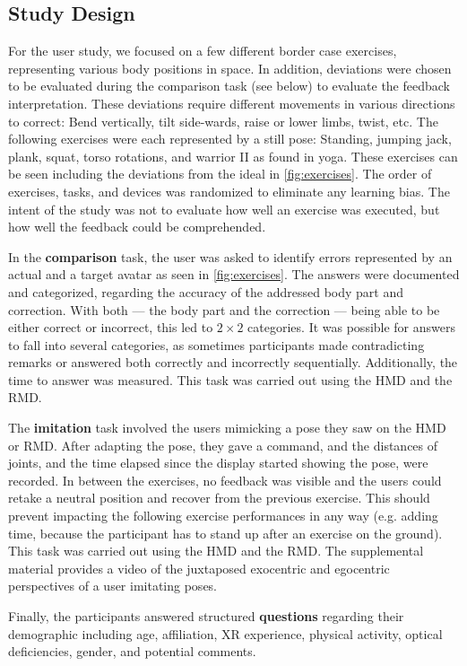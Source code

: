 \subsection{Study Design \label{sec:design}}
For the user study, we focused on a few different border case exercises, representing various body positions in space. In addition, deviations were chosen to be evaluated during the comparison task (see below) to evaluate the feedback interpretation. These deviations require different movements in various directions to correct: Bend vertically, tilt side-wards, raise or lower limbs, twist, etc. The following exercises were each represented by a still pose: Standing, jumping jack, plank, squat, torso rotations, and warrior II as found in yoga. These exercises can be seen including the deviations from the ideal in \autoref{fig:exercises}. The order of exercises, tasks, and devices was randomized to eliminate any learning bias. The intent of the study was not to evaluate how well an exercise was executed, but how well the feedback could be comprehended.

In the \textbf{comparison} task, the user was asked to identify errors represented by an actual and a target avatar as seen in \autoref{fig:exercises}. The answers were documented and categorized, regarding the accuracy of the addressed body part and correction. With both --- the body part and the correction --- being able to be either correct or incorrect, this led to $2 \times 2$ categories. It was possible for answers to fall into several categories, as sometimes participants made contradicting remarks or answered both correctly and incorrectly sequentially. Additionally, the time to answer was measured. This task was carried out using the HMD and the RMD.

The \textbf{imitation} task involved the users mimicking a pose they saw on the HMD or RMD. After adapting the pose, they gave a command, and the distances of joints, and the time elapsed since the display started showing the pose, were recorded. In between the exercises, no feedback was visible and the users could retake a neutral position and recover from the previous exercise. This should prevent impacting the following exercise performances in any way (e.g. adding time, because the participant has to stand up after an exercise on the ground). This task was carried out using the HMD and the RMD. The supplemental material provides a video of the juxtaposed exocentric and egocentric perspectives of a user imitating poses.

Finally, the participants answered structured \textbf{questions} regarding their demographic including age, affiliation, XR experience, physical activity, optical deficiencies, gender, and potential comments.

